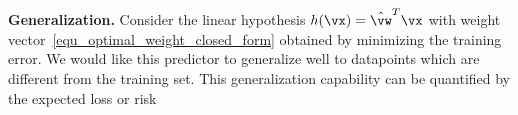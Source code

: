 \documentclass[12pt]{report}
\begin{document}
{\bf Generalization.}
Consider the linear hypothesis $h(\vx) = \hat{\vw}^{T} \vx$ with weight 
vector \eqref{equ_optimal_weight_closed_form} obtained by minimizing 
the training error. We would like this predictor to generalize well to datapoints 
which are different from the training set. This generalization capability can 
be quantified by the expected loss or risk %
%
%
\end{document}

